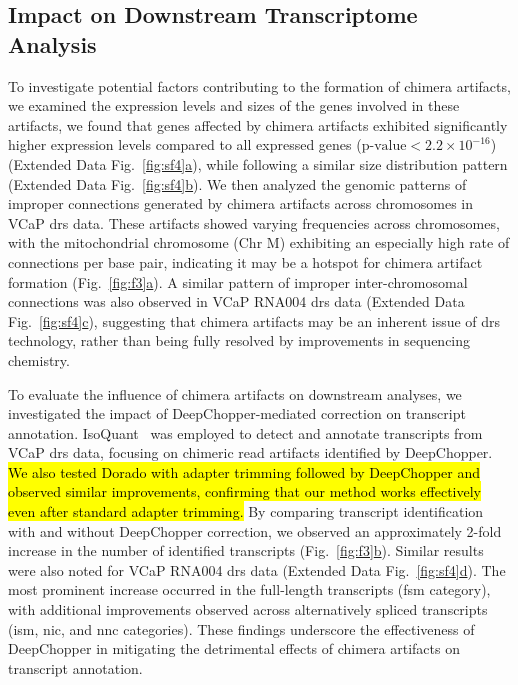 \documentclass[pdflatex,sn-nature, lineno]{sn-jnl}%
\newcommand{\figref}[2]{Fig.~\hyperref[#1]{\ref*{#1}#2}}
\newcommand{\edfigref}[2]{Extended Data Fig.~\hyperref[#1]{\ref*{#1}#2}}
\begin{document}

\subsection{Impact on Downstream Transcriptome Analysis}

To investigate potential factors contributing to the formation of chimera artifacts, we examined the expression levels and sizes of the genes involved in these artifacts, we found that genes affected by chimera artifacts exhibited significantly higher expression levels compared to all expressed genes (\(\textrm{p-value} < 2.2 \times 10^{-16}\)) (\edfigref{fig:sf4}{a}), while following a similar size distribution pattern (\edfigref{fig:sf4}{b}).
We then analyzed the genomic patterns of improper connections generated by chimera artifacts across chromosomes in VCaP \gls{drs} data.
These artifacts showed varying frequencies across chromosomes, with the mitochondrial chromosome (Chr M) exhibiting an especially high rate of connections per base pair, indicating it may be a hotspot for chimera artifact formation (\figref{fig:f3}{a}).
A similar pattern of improper inter-chromosomal connections was also observed in VCaP RNA004 \gls{drs} data (\edfigref{fig:sf4}{c}), suggesting that chimera artifacts may be an inherent issue of \gls{drs} technology, rather than being fully resolved by improvements in sequencing chemistry.

To evaluate the influence of chimera artifacts on downstream analyses, we investigated the impact of DeepChopper-mediated correction on transcript annotation.
IsoQuant~\cite{prjibelski2023accurate} was employed to detect and annotate transcripts from VCaP \gls{drs} data, focusing on chimeric read artifacts identified by DeepChopper.
\hl{We also tested Dorado with adapter trimming followed by DeepChopper and observed similar improvements, confirming that our method works effectively even after standard adapter trimming.}
By comparing transcript identification with and without DeepChopper correction, we observed an approximately 2-fold increase in the number of identified transcripts (\figref{fig:f3}{b}).
Similar results were also noted for VCaP RNA004 \gls{drs} data (\edfigref{fig:sf4}{d}).
The most prominent increase occurred in the full-length transcripts (\gls{fsm} category), with additional improvements observed across alternatively spliced transcripts (\gls{ism}, \gls{nic}, and \gls{nnc} categories).
These findings underscore the effectiveness of DeepChopper in mitigating the detrimental effects of chimera artifacts on transcript annotation.
\end{document}
